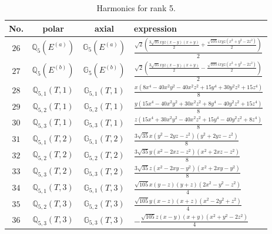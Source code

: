 \documentclass[fleqn,8pt,landscape]{jsarticle}
\begin{document}
\begin{table}[ht!]
\begin{center}
\caption{Harmonics for rank 5.}
\renewcommand{\arraystretch}{1.3}
\begin{tabular}{cccl} \hline \hline
No. & polar & axial & expression \\ \hline
$ 26 $ & $ \mathbb{Q}_{5}(E^{(a)}) $ & $ \mathbb{G}_{5}(E^{(a)}) $ & $ \frac{\sqrt{2} \left(\frac{3 \sqrt{35} x y z \left(x - y\right) \left(x + y\right)}{2} + \frac{\sqrt{105} i x y z \left(x^{2} + y^{2} - 2 z^{2}\right)}{2}\right)}{2} $ \\
$ 27 $ & $ \mathbb{Q}_{5}(E^{(b)}) $ & $ \mathbb{G}_{5}(E^{(b)}) $ & $ \frac{\sqrt{2} \left(\frac{3 \sqrt{35} x y z \left(x - y\right) \left(x + y\right)}{2} - \frac{\sqrt{105} i x y z \left(x^{2} + y^{2} - 2 z^{2}\right)}{2}\right)}{2} $ \\
$ 28 $ & $ \mathbb{Q}_{5,1}(T,1) $ & $ \mathbb{G}_{5,1}(T,1) $ & $ \frac{x \left(8 x^{4} - 40 x^{2} y^{2} - 40 x^{2} z^{2} + 15 y^{4} + 30 y^{2} z^{2} + 15 z^{4}\right)}{8} $ \\
$ 29 $ & $ \mathbb{Q}_{5,2}(T,1) $ & $ \mathbb{G}_{5,2}(T,1) $ & $ \frac{y \left(15 x^{4} - 40 x^{2} y^{2} + 30 x^{2} z^{2} + 8 y^{4} - 40 y^{2} z^{2} + 15 z^{4}\right)}{8} $ \\
$ 30 $ & $ \mathbb{Q}_{5,3}(T,1) $ & $ \mathbb{G}_{5,3}(T,1) $ & $ \frac{z \left(15 x^{4} + 30 x^{2} y^{2} - 40 x^{2} z^{2} + 15 y^{4} - 40 y^{2} z^{2} + 8 z^{4}\right)}{8} $ \\
$ 31 $ & $ \mathbb{Q}_{5,1}(T,2) $ & $ \mathbb{G}_{5,1}(T,2) $ & $ \frac{3 \sqrt{35} x \left(y^{2} - 2 y z - z^{2}\right) \left(y^{2} + 2 y z - z^{2}\right)}{8} $ \\
$ 32 $ & $ \mathbb{Q}_{5,2}(T,2) $ & $ \mathbb{G}_{5,2}(T,2) $ & $ \frac{3 \sqrt{35} y \left(x^{2} - 2 x z - z^{2}\right) \left(x^{2} + 2 x z - z^{2}\right)}{8} $ \\
$ 33 $ & $ \mathbb{Q}_{5,3}(T,2) $ & $ \mathbb{G}_{5,3}(T,2) $ & $ \frac{3 \sqrt{35} z \left(x^{2} - 2 x y - y^{2}\right) \left(x^{2} + 2 x y - y^{2}\right)}{8} $ \\
$ 34 $ & $ \mathbb{Q}_{5,1}(T,3) $ & $ \mathbb{G}_{5,1}(T,3) $ & $ \frac{\sqrt{105} x \left(y - z\right) \left(y + z\right) \left(2 x^{2} - y^{2} - z^{2}\right)}{4} $ \\
$ 35 $ & $ \mathbb{Q}_{5,2}(T,3) $ & $ \mathbb{G}_{5,2}(T,3) $ & $ \frac{\sqrt{105} y \left(x - z\right) \left(x + z\right) \left(x^{2} - 2 y^{2} + z^{2}\right)}{4} $ \\
$ 36 $ & $ \mathbb{Q}_{5,3}(T,3) $ & $ \mathbb{G}_{5,3}(T,3) $ & $ - \frac{\sqrt{105} z \left(x - y\right) \left(x + y\right) \left(x^{2} + y^{2} - 2 z^{2}\right)}{4} $ \\
 \hline \hline
\end{tabular}
\end{center}
\end{table}
\end{document}
